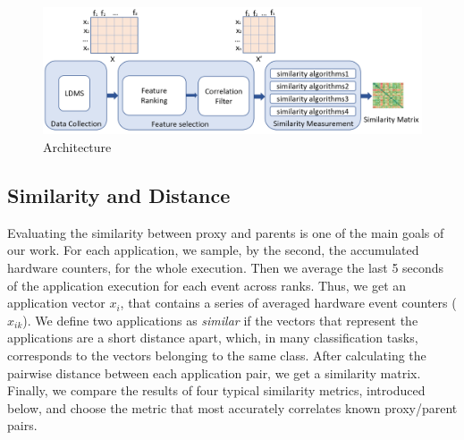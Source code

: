 \begin{figure}[ht]
\centering
\includegraphics[width=\linewidth]{figs/SimEngine.png}
\caption{\us Architecture }
\label{figs:us}
\end{figure}

\subsection{Similarity and Distance}
\label{sec:Sim}

Evaluating the similarity between proxy and parents is one of the main goals of our work.
For each application, we sample, by the second, the accumulated hardware counters, for the whole execution. Then we average the last 5 seconds of the application execution for each event across ranks. Thus, we get an application vector $x_{i}$, that contains a series of averaged hardware event counters (\ie $x_{ik}$). 
We define two applications as \emph{similar} if the vectors that represent the applications are a short distance apart, which, in many classification tasks, corresponds to the vectors belonging to the same class. %
After calculating the pairwise distance between each application pair, we get a similarity matrix. %
Finally, we compare the results of four typical similarity metrics, introduced below, and choose the metric that most accurately correlates known proxy/parent pairs. 

